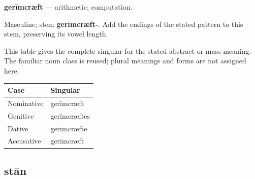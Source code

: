 \par\begin{minipage}{\linewidth}\raggedright
\textbf{gerīmcræft} — arithmetic; computation.

Masculine; stem \textbf{gerīmcræft-}. Add the endings of the stated pattern to this stem, preserving its vowel length.

This table gives the complete singular for the stated abstract or mass meaning. The familiar noun class is reused; plural meanings and forms are not assigned here.

\par\begingroup
\fontsize{10.5}{13.2}\selectfont
\setlength{\LTleft}{0pt}\setlength{\LTright}{\fill}
\noindent
\begin{tabular}{@{}>{\raggedright\arraybackslash}p{55.09mm}>{\raggedright\arraybackslash}p{66.1mm}@{}}
\toprule
\textbf{Case} & \textbf{Singular} \\
\midrule
Nominative & gerīmcræft \\
Genitive & gerīmcræftes \\
Dative & gerīmcræfte \\
Accusative & gerīmcræft \\
\bottomrule
\end{tabular}
\par\endgroup

\end{minipage}\par
{}
\subsection*{stān}

